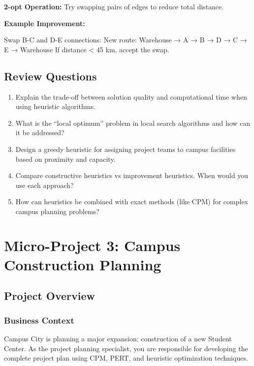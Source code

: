 \documentclass[
  letterpaper,
  DIV=11,
  numbers=noendperiod]{scrreprt}
\begin{document}
\textbf{2-opt Operation:} Try swapping pairs of edges to reduce total
distance.

\textbf{Example Improvement:}

Swap B-C and D-E connections: New route: Warehouse → A → B → D → C → E →
Warehouse If distance \textless{} 45 km, accept the swap.

\subsection{Review Questions}\label{review-questions-10}

\begin{enumerate}
\def\labelenumi{\arabic{enumi}.}
\item
  Explain the trade-off between solution quality and computational time
  when using heuristic algorithms.
\item
  What is the ``local optimum'' problem in local search algorithms and
  how can it be addressed?
\item
  Design a greedy heuristic for assigning project teams to campus
  facilities based on proximity and capacity.
\item
  Compare constructive heuristics vs improvement heuristics. When would
  you use each approach?
\item
  How can heuristics be combined with exact methods (like CPM) for
  complex campus planning problems?
\end{enumerate}

\section{Micro-Project 3: Campus Construction
Planning}\label{micro-project-3-campus-construction-planning}

\subsection{Project Overview}\label{project-overview}

\subsubsection{Business Context}\label{business-context}

Campus City is planning a major expansion: construction of a new Student
Center. As the project planning specialist, you are responsible for
developing the complete project plan using CPM, PERT, and heuristic
optimization techniques.
\end{document}

